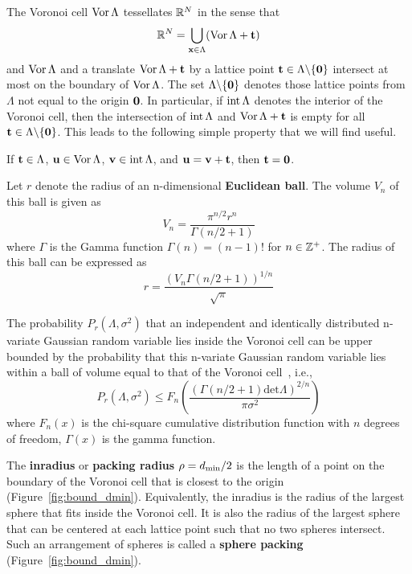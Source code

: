 The Voronoi cell $\operatorname{Vor}\Lambda$ tessellates ${\mathbb R}^N$ in the sense that
\[
{\mathbb R}^N = \bigcup_{\mathbf{x} \in \Lambda} (\operatorname{Vor}\Lambda + \mathbf{t})
\]
and $\operatorname{Vor}\Lambda$ and a translate $\operatorname{Vor}\Lambda + \mathbf{t}$ by a lattice point $\mathbf{t} \in \Lambda\backslash  \{\boldsymbol{0}\}$ intersect at most on the boundary of $\operatorname{Vor}\Lambda$.  The set $\Lambda \backslash  \{\boldsymbol{0}\}$ denotes those lattice points from $\Lambda$ not equal to the origin $\boldsymbol{0}$.  In particular, if $\operatorname{int}\Lambda$ denotes the interior of the Voronoi cell, then the intersection of $\operatorname{int}\Lambda$ and $\operatorname{Vor} \Lambda + \mathbf{t}$ is empty for all $\mathbf{t} \in \Lambda \backslash  \{\boldsymbol{0}\}$.  %
This leads to the following simple property that we will find useful.

\begin{remark}\label{remarksimpleintvor}
If $\mathbf{t} \in \Lambda$, $\mathbf{u} \in \operatorname{Vor}\Lambda$, $\mathbf{v} \in \operatorname{int}\Lambda$, and $\mathbf{u} = \mathbf{v} + \mathbf{t}$, then $\mathbf{t} = \boldsymbol{0}$.
\end{remark}


Let $r$ denote the radius of an n-dimensional \textbf{Euclidean ball}. The volume $V_n$ of this ball is given as
\[
V_n = \frac{\pi^{n/2}r^n}{\Gamma(n/2 + 1)} 
\]
where $\Gamma$ is the Gamma function $\Gamma(n)=(n-1)!$ for $n\in {\mathbb Z}^+$. The radius of this ball can be expressed as
\[
r =  \dfrac{\left (V_n \Gamma(n/2 + 1)\right)^{1/n}}{\sqrt{\pi}} 
\]

The probability $P_r(\Lambda, \sigma^2)$ that an independent and identically distributed n-variate Gaussian random variable lies inside the Voronoi cell can be upper bounded by the probability that this n-variate Gaussian random variable lies within a ball of volume equal to that of the Voronoi cell~\cite[Sec.~IV.C]{Hassibi_GPS_1998}, i.e.,
\begin{equation}\label{ch2:upperBoundUsingSphere}
P_r(\Lambda, \sigma^2) \leq F_n \left( \frac{ \left (  \Gamma(n/2 + 1)  \text{det}\Lambda  \right)^{2/n} } {\pi \sigma^2} \right)
\end{equation}
where $F_n(x)$ is the chi-square cumulative distribution function with $n$ degrees of freedom,  $\Gamma(x)$ is the gamma function.

The \textbf{inradius} or \textbf{packing radius} $\rho = d_{\text{min}}/2$ is the length of a point on the boundary of the Voronoi cell that is closest to the origin (Figure~\ref{fig:bound_dmin}).  Equivalently, the inradius is the radius of the largest sphere that fits inside the Voronoi cell.  It is also the radius of the largest sphere that can be centered at each lattice point such that no two spheres intersect.  Such an arrangement of spheres is called a \textbf{sphere packing} (Figure~\ref{fig:bound_dmin}).

